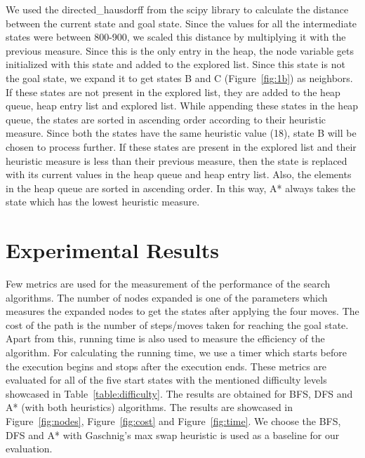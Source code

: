 \documentclass{svproc}
\begin{document}
\noindent We used the directed\_hausdorff from the scipy library to calculate the distance between the current state and goal state. Since the values for all the intermediate states were between 800-900, we scaled this distance by multiplying it with the previous measure. Since this is the only entry in the heap, the node variable gets initialized with this state and added to the explored list. Since this state is not the goal state, we expand it to get states B and C (Figure~\ref{fig:1b}) as neighbors. If these states are not present in the explored list, they are added to the heap queue, heap entry list and explored list. While appending these states in the heap queue, the states are sorted in ascending order according to their heuristic measure. Since both the states have the same heuristic value (18), state B will be chosen to process further. If these states are present in the explored list and their heuristic measure is less than their previous measure, then the state is replaced with its current values in the heap queue and heap entry list. Also, the elements in the heap queue are sorted in ascending order. In this way, A* always takes the state which has the lowest heuristic measure. 

\section{Experimental Results}
\noindent Few metrics are used for the measurement of the performance of the search algorithms. The number of nodes expanded is one of the parameters which measures the  expanded nodes to get the states after applying the four moves. The cost of the path is the number of steps/moves taken for reaching the goal state. Apart from this, running time is also used to measure the efficiency of the algorithm. For calculating the running time, we use a timer which starts before the execution begins and stops after the execution ends. These metrics are evaluated for all of the five start states with the mentioned difficulty levels showcased in Table~\ref{table:difficulty}. The results are obtained for BFS, DFS and A* (with both heuristics) algorithms. The results are showcased in Figure~\ref{fig:nodes}, Figure~\ref{fig:cost} and Figure~\ref{fig:time}. We choose the BFS, DFS and A* with Gaschnig's max swap heuristic is used as a baseline for our evaluation.\\
\end{document}
